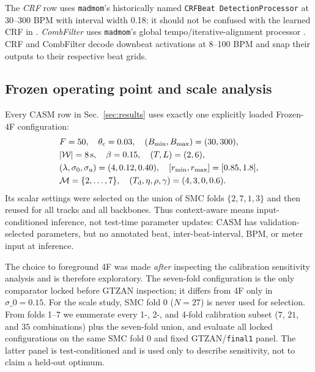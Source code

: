 \documentclass{article}
\begin{document}
The \emph{CRF} row uses \texttt{madmom}'s historically named \texttt{CRFBeat DetectionProcessor} \cite{korzeniowski2014crf} at 30--300 BPM with interval width 0.18; it should not be confused with the learned CRF in \cite{fillon2015crf}. \emph{CombFilter} uses \texttt{madmom}'s global tempo/iterative-alignment processor \cite{bock2015combfilter}. CRF and CombFilter decode downbeat activations at 8--100 BPM and snap their outputs to their respective beat grids.

\subsection{Frozen operating point and scale analysis}
Every CASM row in Sec.~\ref{sec:results} uses exactly one explicitly loaded
Frozen-4F configuration:
\[
\begin{split}
&F=50,\quad \theta_{\mathrm c}=0.03,\quad
(B_{\min},B_{\max})=(30,300),\\
&|\mathcal W|=8{\rm\,s},\quad \beta=0.15,\quad
(T,L)=(2,6),\\
&(\lambda,\sigma_0,\sigma_{\mathrm u})=(4,0.12,0.40),\quad
[r_{\min},r_{\max}]=[0.85,1.8],\\
&\mathcal M=\{2,\ldots,7\},\quad
(T_{\mathrm d},\eta,\rho,\gamma)=(4,3,0,0.6).
\end{split}
\]
Its scalar settings were selected on the union of SMC folds $\{2,7,1,3\}$ and then reused for all tracks and all backbones. Thus context-aware means input-conditioned inference, not test-time parameter updates: CASM has validation-selected parameters, but no annotated beat, inter-beat-interval, BPM, or meter input at inference.

The choice to foreground 4F was made \emph{after} inspecting the calibration sensitivity analysis and is therefore exploratory. The seven-fold configuration is the only comparator locked before GTZAN inspection; it differs from 4F only in $\sigma\_0=0.15$. For the scale study, SMC fold 0 ($N=27$) is never used for selection. From folds 1--7 we enumerate every 1-, 2-, and 4-fold calibration subset ($7$, $21$, and $35$ combinations) plus the seven-fold union, and evaluate all locked configurations on the same SMC fold 0 and fixed GTZAN/\texttt{final1} panel. The latter panel is test-conditioned and is used only to describe sensitivity, not to claim a held-out optimum.



\end{document}
